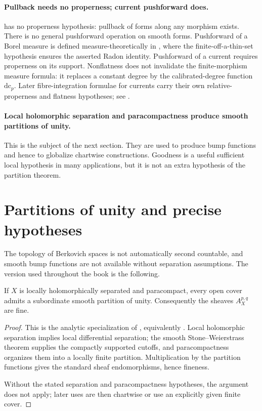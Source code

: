 \paragraph{Pullback needs no properness; current pushforward does.}
 has no properness hypothesis: pullback of forms
along any morphism exists.  There is no general pushforward operation on
smooth forms.  Pushforward of a Borel measure is defined measure-theoretically
in , where the finite-off-a-thin-set
hypothesis ensures the asserted Radon identity.  Pushforward of a current
requires properness on its support.  Nonflatness does not invalidate the
finite-morphism measure formula: it replaces a constant degree by the
calibrated-degree function $\mathrm{dc}_p$.  Later fibre-integration formulae
for currents carry their own relative-properness and flatness hypotheses; see
\cite[Theorem~16.5.4 and Remark~16.5.6]{CLD25}.

\paragraph{Local holomorphic separation and paracompactness produce smooth
partitions of unity.}
This is the subject of the next section.  They are used to produce bump
functions and hence to globalize chartwise constructions.  Goodness is a
useful sufficient local hypothesis in many applications, but it is not an
extra hypothesis of the partition theorem.

\section{Partitions of unity and precise hypotheses}
\label{sec:ch13-partitions}

The topology of Berkovich spaces is not automatically second countable, and
smooth bump functions are not available without separation assumptions.
The version used throughout the book is the following.

\begin{theorem}\label{thm:cld-smooth-partition}
If $X$ is locally holomorphically separated and paracompact, every open cover
admits a subordinate smooth partition of unity.  Consequently the sheaves
$A_X^{p,q}$ are fine.
\end{theorem}
\begin{proof}
This is the analytic specialization of
, equivalently
\cite[Proposition~15.2.8]{CLD25}.  Local holomorphic separation implies local
differential separation; the smooth Stone--Weierstrass theorem supplies the
compactly supported cutoffs, and paracompactness organizes them into a
locally finite partition.  Multiplication by the partition functions gives
the standard sheaf endomorphisms, hence fineness.

Without the stated separation and paracompactness hypotheses, the argument
does not apply; later uses are then chartwise or use an explicitly given
finite cover.
\end{proof}

